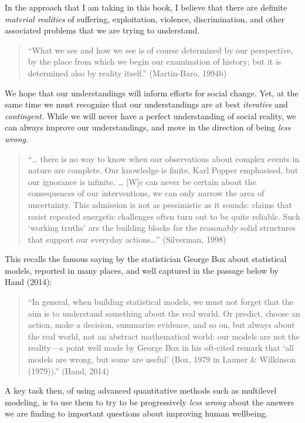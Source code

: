 \documentclass[
  letterpaper,
  DIV=11,
  numbers=noendperiod]{scrreprt}
\begin{document}
In the approach that I am taking in this book, I believe that there are
definite \emph{material realities} of suffering, exploitation, violence,
discrimination, and other associated problems that we are trying to
understand.

\begin{quote}
``What we see and how we see is of course determined by our perspective,
by the place from which we begin our examination of history; but it is
determined also by reality itself.'' (Martin-Baro, 1994b)
\end{quote}

We hope that our understandings will inform efforts for social change.
Yet, at the same time we must recognize that our understandings are at
best \emph{iterative} and \emph{contingent.} While we will never have a
perfect understanding of social reality, we can always improve our
understandings, and move in the direction of being \emph{less wrong}.

\begin{quote}
``\ldots{} there is no way to know when our observations about complex
events in nature are complete. Our knowledge is finite, Karl Popper
emphasised, but our ignorance is infinite. \ldots{} {[}W{]}e can never
be certain about the consequences of our interventions, we can only
narrow the area of uncertainty. This admission is not as pessimistic as
it sounds: claims that resist repeated energetic challenges often turn
out to be quite reliable. Such `working truths' are the building blocks
for the reasonably solid structures that support our everyday
actions\ldots{}'' (Silverman, 1998)
\end{quote}

This recalls the famous saying by the statistician George Box about
statistical models, reported in many places, and well captured in the
passage below by Hand (2014):

\begin{quote}
``In general, when building statistical models, we must not forget that
the aim is to understand something about the real world. Or predict,
choose an action, make a decision, summarize evidence, and so on, but
always about the real world, not an abstract mathematical world: our
models are not the reality---a point well made by George Box in his
oft-cited remark that `all models are wrong, but some are useful' (Box,
1979 in Launer \& Wilkinson (1979)).'' (Hand, 2014)
\end{quote}

A key task then, of using advanced quantitative methods such as
multilevel modeling, is to use them to try to be progressively
\emph{less wrong} about the answers we are finding to important
questions about improving human wellbeing.
\end{document}
